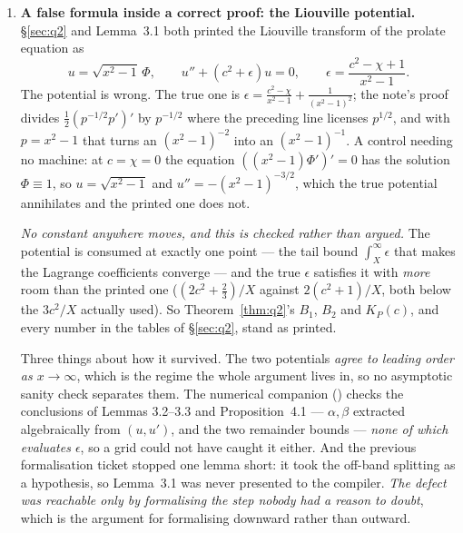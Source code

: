\documentclass[11pt,a4paper]{article}
\theoremstyle{plain}
\theoremstyle{definition}
\theoremstyle{remark}
\newcommand{\file}[1]{\path{#1}}
\begin{document}
\begin{enumerate}
Two things about how it survived.  It is a \emph{structural} omission and not a
transcription slip --- the Lean statement cannot be written down without (F),
which is exactly why formalising found it on the first attempt at the corollary
--- and it survived because the paper supplies (F) two hundred lines earlier, in
a subsection about a different question (\S\ref{sec:fuchs}, on whether the rate
discriminates the index), so every reader who checked the corollary against the
paper found the fact present and the hypothesis list unexamined.
\item \textbf{A false formula inside a correct proof: the Liouville potential.}
\S\ref{sec:q2} and \file{notes/dilate-sum.md} Lemma~3.1 both printed the
Liouville transform of the prolate equation as
\[
  u=\sqrt{x^2-1}\,\Phi,\qquad u''+(c^2+\epsilon)u=0,\qquad
  \epsilon=\frac{c^2-\chi+1}{x^2-1}.
\]
The potential is wrong.  The true one is
$\epsilon=\frac{c^2-\chi}{x^2-1}+\frac{1}{(x^2-1)^2}$; the note's proof divides
$\tfrac12(p^{-1/2}p')'$ by $p^{-1/2}$ where the preceding line licenses $p^{1/2}$,
and with $p=x^2-1$ that turns an $(x^2-1)^{-2}$ into an $(x^2-1)^{-1}$.  A control
needing no machine: at $c=\chi=0$ the equation $((x^2-1)\Phi')'=0$ has the
solution $\Phi\equiv1$, so $u=\sqrt{x^2-1}$ and $u''=-(x^2-1)^{-3/2}$, which the
true potential annihilates and the printed one does not.

\emph{No constant anywhere moves, and this is checked rather than argued.}  The
potential is consumed at exactly one point --- the tail bound $\int_X^\infty
\epsilon$ that makes the Lagrange coefficients converge --- and the true
$\epsilon$ satisfies it with \emph{more} room than the printed one
($(2c^2+\tfrac23)/X$ against $2(c^2+1)/X$, both below the $3c^2/X$ actually
used).  So Theorem~\ref{thm:q2}'s $B_1$, $B_2$ and $K_P(c)$, and every number in
the tables of \S\ref{sec:q2}, stand as printed.

Three things about how it survived.  The two potentials \emph{agree to leading
order as $x\to\infty$}, which is the regime the whole argument lives in, so no
asymptotic sanity check separates them.  The numerical companion
(\file{notes/verify_q2.py}) checks the conclusions of Lemmas 3.2--3.3 and
Proposition~4.1 --- $\alpha,\beta$ extracted algebraically from $(u,u')$, and
the two remainder bounds --- \emph{none of which evaluates $\epsilon$}, so a grid
could not have caught it either.  And the previous formalisation ticket stopped
one lemma short: it took the off-band splitting as a hypothesis, so Lemma~3.1 was
never presented to the compiler.  \emph{The defect was reachable only by
formalising the step nobody had a reason to doubt}, which is the argument for
formalising downward rather than outward.
\end{enumerate}
\end{document}
